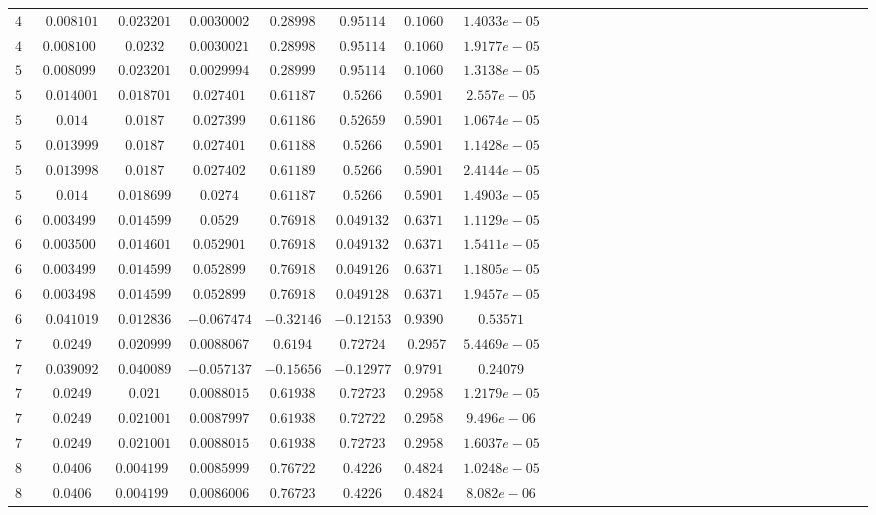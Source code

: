 \begin{table}[!htbp]
\begin{tabular}{c c c c c c c c c c c c c c c c c c c c c c c c c c c c c c c }
$43 $&$0.008101$&$0.023201   $&$0.0030002$&$ 0.28998$&$ 0.95114$&$ 0.10606$&$1.4033e-05$\\
$44 $&$0.0081009$&$  0.0232  $&$ 0.0030021$&$0.28998$&$  0.95114$&$ 0.10604$&$1.9177e-05$\\
$55 $&$0.0080991$&$ 0.023201 $&$  0.0029994 $&$0.28999$&$0.95114 $&$0.10606$&$1.3138e-05$\\
$51 $&$0.014001$&$0.018701   $&$ 0.027401$&$ 0.61187$&$ 0.5266$&$0.59018$&$2.557e-05$\\
$52 $&$0.014    $&$  0.0187    $&$0.027399$&$   0.61186$&$0.52659$&$0.59019$&$1.0674e-05$\\
$53 $&$0.013999$&$  0.0187    $&$0.027401$&$ 0.61188$&$0.5266$&$0.59017$&$1.1428e-05$\\
$54 $&$0.013998$&$   0.0187$&$    0.027402$&$  0.61189 $&$0.5266$&$0.59016$&$2.4144e-05$\\
$55 $&$0.014    $&$0.018699   $&$   0.0274$&$ 0.61187$&$ 0.5266$&$0.59017$&$1.4903e-05$\\
$61 $&$0.0034997$&$ 0.014599$&$      0.0529$&$  0.76918 $&$0.049132 $&$0.63714$&$1.1129e-05$\\
$62 $&$0.0035007$&$ 0.014601  $&$  0.052901$&$0.76918$&$0.049132 $&$0.63714$&$1.5411e-05$\\
$63 $&$0.0034994$&$ 0.014599$&$0.052899$&$ 0.76918$&$ 0.049126$&$0.63714$&$1.1805e-05$\\
$64 $&$0.0034989$&$ 0.014599$&$ 0.052899$&$   0.76918$&$0.049128$&$0.63714$&$1.9457e-05$\\
$65 $&$0.041019$&$0.012836$&$ -0.067474$&$-0.32146$&$-0.12153$&$ 0.93909$&$0.53571$\\
$71 $&$0.0249    $&$0.020999 $&$0.0088067 $&$0.6194  $&$0.72724$&$   0.2957$&$  5.4469e-05$\\
$72 $&$0.039092$&$ 0.040089$&$-0.057137$&$ -0.15656$&$-0.12977$&$0.97911$&$0.24079$\\
$73 $&$0.0249$&$   0.021   $&$0.0088015$&$0.61938$&$0.72723$&$0.29582$&$1.2179e-05$\\
$74 $&$0.0249    $&$0.021001$&$ 0.0087997$&$0.61938$&$0.72722$&$ 0.29584$&$9.496e-06$\\
$75 $&$0.0249    $&$0.021001 $&$  0.0088015 $&$0.61938$&$0.72723$&$0.29582$&$1.6037e-05$\\
$81 $&$0.0406   $&$0.0041992$&$ 0.0085999$&$   0.76722 $&$0.4226$&$0.48248$&$1.0248e-05$\\
$82 $&$0.0406   $&$0.0041997$&$0.0086006$&$ 0.76723$&$ 0.4226$&$0.48247$&$8.082e-06$\\

\end{tabular}
\end{table}
